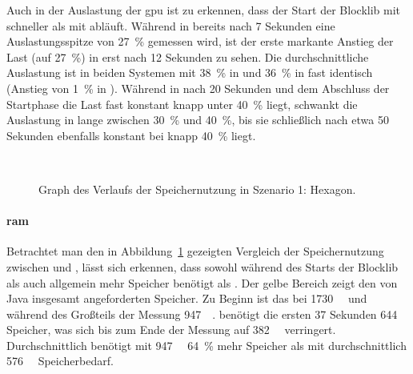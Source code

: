 Auch in der Auslastung der \ac{gpu} ist zu erkennen, dass der Start der Blocklib mit \sysA{} schneller als mit \sysB{} abläuft. Während in \sysA{} bereits nach 7 Sekunden eine Auslastungsspitze von \SI{27}{\percent} gemessen wird, ist der erste markante Anstieg der Last (auf \SI{27}{\percent}) in \sysB{}  erst nach 12 Sekunden zu sehen. Die durchschnittliche Auslastung ist in beiden Systemen mit \SI{38}{\percent} in \sysA{} und \SI{36}{\percent} in \sysB{} fast identisch (Anstieg von \SI{1}{\percent} in \sysB{}). Während in \sysB{} nach 20 Sekunden und dem Abschluss der Startphase die Last fast konstant knapp unter \SI{40}{\percent} liegt, schwankt die Auslastung in \sysA{} lange zwischen \SI{30}{\percent} und \SI{40}{\percent}, bis sie schließlich nach etwa 50 Sekunden ebenfalls konstant bei knapp \SI{40}{\percent} liegt.

\begin{figure}[!htbp]
	\\
	\caption{Graph des Verlaufs der Speichernutzung in Szenario 1: Hexagon.}\label{fig:seed-0-hexagon-mem}
\end{figure} 
\paragraph{\ac{ram}} Betrachtet man den in Abbildung~\ref{fig:seed-0-hexagon-mem} gezeigten Vergleich der Speichernutzung zwischen \sysA{} und \sysB{}, lässt sich erkennen, dass \sysB{} sowohl während des Starts der Blocklib als auch allgemein mehr Speicher benötigt als \sysA{}. Der gelbe Bereich zeigt den von Java insgesamt angeforderten Speicher. Zu Beginn ist das bei \sysB{} \SI{1730}{\mega\byte} und während des Großteils der Messung \SI{947}{\mega\byte}. \sysA{} benötigt die ersten 37 Sekunden \SI{644}{\mega\byte} Speicher, was sich bis zum Ende der Messung auf \SI{382}{\mega\byte} verringert. Durchschnittlich benötigt \sysB{} mit \SI{947}{\mega\byte} \SI{64}{\percent} mehr Speicher als \sysA{} mit durchschnittlich \SI{576}{\mega\byte} Speicherbedarf.

